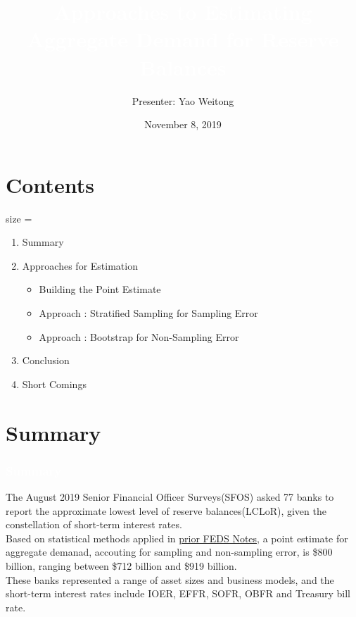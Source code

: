 \documentclass{beamer}	%
\title{\textcolor{white}{Approaches to Estimating Aggregate Demand for Reserve Balances}}
\author{Presenter: Yao Weitong}
\date{November 8, 2019}
\theoremstyle{plain}
\theoremstyle{definition}
\theoremstyle{remark}
\numberwithin{equation}{section}
\begin{document}
\begin{frame}
\titlepage
\end{frame}

\section{Contents}
\begin{frame}{size = \large}
	\begin{enumerate}[1.]%
	\item Summary
	\item Approaches for Estimation
		\begin{itemize}\setlength{\itemsep}{3pt} 
		\item Building the Point Estimate
		\item Approach \uppercase\expandafter{} : Stratified Sampling for Sampling Error
		\item Approach \uppercase\expandafter{}: Bootstrap for Non-Sampling Error
		\end{itemize} 
	\item Conclusion
	\item Short Comings
	\end{enumerate}  \vspace{0.5cm}
\end{frame}


\section{Summary}

\begin{frame}
\frametitle{\textcolor{white}{Summary}}
\small 
The August 2019 Senior Financial Officer Surveys(SFOS) asked 77 banks to report the approximate lowest level of reserve balances(LCLoR), given the constellation of short-term interest rates.\\

\vbox{} 
Based on statistical methods applied in \href{https://www.federalreserve.gov/econres/notes/feds-notes/estimating-system-demand-for-reserve-balances-using-the-2018-senior-financial-officer-survey-20190409.htm}{\textcolor{UniOrange}{prior FEDS Notes}}, a point estimate for aggregate demanad, accouting for sampling and non-sampling error, is \$800 billion, ranging between \$712 billion and \$919 billion.\\

\vbox{}
These banks represented a range of asset sizes and business models, and the short-term interest rates include IOER, EFFR, SOFR, OBFR and Treasury bill rate.
\end{frame}\vspace{0.5cm}
\end{document}
